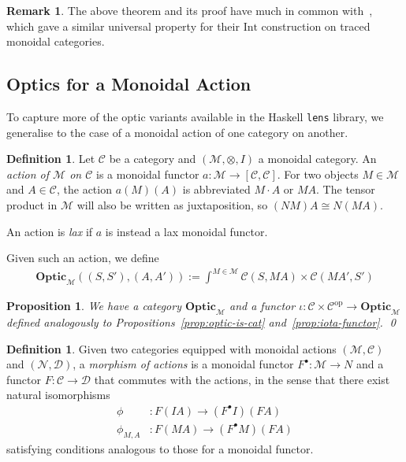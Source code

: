 \documentclass[11pt,letterpaper]{article}
\theoremstyle{plain}
\newtheorem{proposition}[theorem]{Proposition}
\theoremstyle{definition}
\newtheorem{definition}[theorem]{Definition}
\newtheorem{remark}[theorem]{Remark}
\newcommand{\C}{\mathscr{C}}
\newcommand{\D}{\mathscr{D}}
\newcommand{\M}{\mathscr{M}}
\newcommand{\N}{\mathscr{N}}
\newcommand{\lenslib}{\texttt{lens}}
\newcommand{\Optic}{\mathbf{Optic}}
\newcommand{\op}{\mathrm{op}}
\newcommand{\act}{\cdot}
\newcommand{\todo}[1]{\textcolor{red}{\small #1}}
\begin{document}
\begin{remark}
The above theorem and its proof have much in common with~\cite[Proposition 5.2]{JoyalStreetVerity}, which gave a similar universal property for their $\mathrm{Int}$ construction on traced monoidal categories.
\end{remark}

\subsection{Optics for a Monoidal Action}

To capture more of the optic variants available in the Haskell \lenslib{} library, we generalise to the case of a monoidal action of one category on another.

\begin{definition}
  Let $\C$ be a category and $(\M, \otimes, I)$ a monoidal category. An \emph{action of $\M$ on $\C$} is a monoidal functor $a : \M \to [\C, \C]$. For two objects $M \in \M$ and $A \in \C$, the action $a(M)(A)$ is abbreviated $M \act A$ or $MA$. The tensor product in $\M$ will also be written as juxtaposition, so $(NM)A \cong N(MA)$.

An action is \emph{lax} if $a$ is instead a lax monoidal functor.
\end{definition}

Given such an action, we define
\begin{align*}
  \Optic_\M((S, S'), (A, A')) := \int^{M \in \M} \C(S, MA) \times \C(MA', S')
\end{align*}

\begin{proposition}
  We have a category $\Optic_\M$ and a functor $\iota : \C \times \C^\op \to \Optic_\M$ defined analogously to Propositions~\ref{prop:optic-is-cat} and~\ref{prop:iota-functor}. \qed
\end{proposition}

\begin{definition}
Given two categories equipped with monoidal actions $(\M, \C)$ and $(\N, \D)$, a \emph{morphism of actions} is a monoidal functor $F^\bullet : \M \to N$ and a functor $F : \C \to \D$ that commutes with the actions, in the sense that there exist natural isomorphisms
  \begin{align*}
  \phi &: F(I A) \to (F^\bullet I)(FA) \\
  \phi_{M,A} &: F(MA) \to (F^\bullet M)(F A)
  \end{align*}
satisfying conditions analogous to those for a monoidal functor.

\end{definition}
\end{document}

